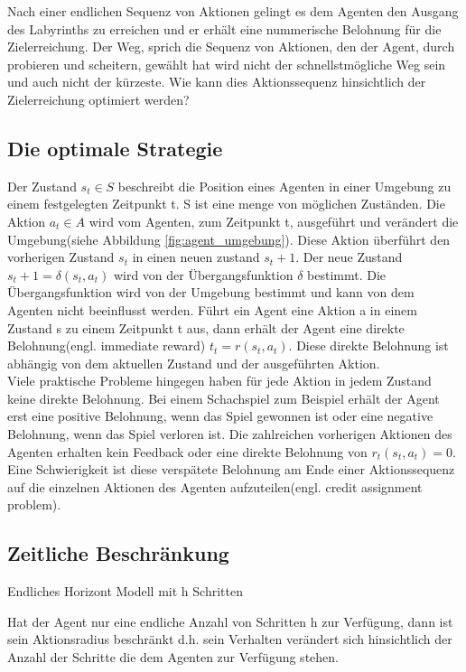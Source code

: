 Nach einer endlichen Sequenz von Aktionen gelingt es dem Agenten den Ausgang des Labyrinths zu erreichen und er erhält eine nummerische Belohnung für die Zielerreichung. Der Weg, sprich die Sequenz von Aktionen, den der Agent, durch probieren und scheitern, gewählt hat wird nicht der schnellstmögliche Weg sein und auch nicht der kürzeste. Wie kann dies Aktionssequenz hinsichtlich der Zielerreichung optimiert werden? \\

\subsection{Die optimale Strategie}
Der Zustand $s_t \in S$ beschreibt die Position eines Agenten in einer Umgebung zu einem festgelegten Zeitpunkt t. S ist eine menge von möglichen Zuständen. Die Aktion $a_t \in A$ wird vom Agenten, zum Zeitpunkt t, ausgeführt und verändert die Umgebung(siehe Abbildung \ref{fig:agent_umgebung}). Diese Aktion überführt den vorherigen Zustand $s_t$ in einen neuen zustand $s_t+1$. Der neue Zustand $s_t+1 = \delta(s_t, a_t)$ wird von der Übergangsfunktion $\delta$ bestimmt. Die Übergangsfunktion wird von der Umgebung bestimmt und kann von dem Agenten nicht beeinflusst werden. Führt ein Agent eine Aktion a in einem Zustand s zu einem Zeitpunkt t aus, dann erhält der Agent eine direkte Belohnung(engl. immediate reward) $t_t = r(s_t, a_t)$. Diese direkte Belohnung ist abhängig von dem aktuellen Zustand und der ausgeführten Aktion.\\

Viele praktische Probleme hingegen haben für jede Aktion in jedem Zustand keine direkte Belohnung. Bei einem Schachspiel zum Beispiel erhält der Agent erst eine positive Belohnung, wenn das Spiel gewonnen ist oder eine negative Belohnung, wenn das Spiel verloren ist. Die zahlreichen vorherigen Aktionen des Agenten erhalten kein Feedback oder eine direkte Belohnung von $r_t(s_t, a_t) = 0$. Eine Schwierigkeit ist diese verspätete Belohnung am Ende einer Aktionssequenz auf die einzelnen Aktionen des Agenten aufzuteilen(engl. credit assignment problem).

\cite[290]{Ertel}   

\subsection{Zeitliche Beschränkung}
Endliches Horizont Modell mit h Schritten

Hat der Agent nur eine endliche Anzahl von Schritten h zur Verfügung, dann ist sein Aktionsradius beschränkt d.h. sein Verhalten verändert sich hinsichtlich der Anzahl der Schritte die dem Agenten zur Verfügung stehen. 

